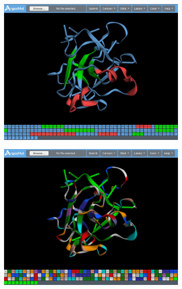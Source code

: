 \documentclass{article}
\begin{document}
\begin{figure}[H]
\begin{subfigure}{.5\textwidth}
		\includegraphics[width=.99\linewidth]{img/argosmol/mol8}
		\caption{}
		\label{fig:sfig1}
	\end{subfigure}%
	\begin{subfigure}{.5\textwidth}
		\centering
		\includegraphics[width=.99\linewidth]{img/argosmol/mol9}
		\caption{}
		\label{fig:sfig2}
	\end{subfigure}
	\begin{subfigure}{.5\textwidth}
		\centering

\end{subfigure}
\end{figure}
\end{document}
